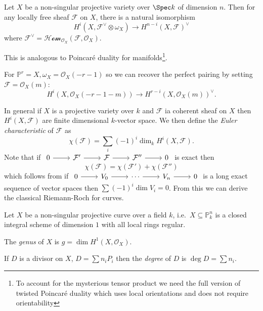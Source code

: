 \documentclass[a4paper]{article}
\renewcommand*{\P}{\mathbb{P}}
\newcommand{\sh}[1]{\mathcal{#1}} %
\begin{document}
\begin{theorem}
  Let \(X\) be a non-singular projective variety over \(\Spec k\) of dimension \(n\). Then for any locally free sheaf \(\sh F\) on \(X\), there is a natural isomorphism
  \[
    H^i(X, \sh F^\vee \otimes \omega_X) \to H^{n - i}(X, \sh F)^\vee
  \]
  where \(\sh F^\vee = \sh{Hom}_{\sh O_X}(\sh F, \sh O_X)\).
\end{theorem}

This is analogous to Poincaré duality for manifolds\footnote{To account for the mysterious tensor product we need the full version of twisted Poincaré duality which uses local orientations and does not require orientability}.

\begin{eg}
  For \(\P^r = X, \omega_X = \sh O_X(-r - 1)\) so we can recover the perfect pairing by setting \(\sh F = \sh O_X(m)\):
  \[
    H^i(X, \sh O_X(-r - 1 - m)) \to H^{r - i}(X, \sh O_X(m))^\vee.
  \]
\end{eg}

In general if \(X\) is a projective variety over \(k\) and \(\sh F\) ia coherent sheaf on \(X\) then \(H^i(X, \sh F)\) are finite dimensional \(k\)-vector space. We then define the \emph{Euler characteristic} of \(\sh F\) as
\[
  \chi(\sh F) = \sum_i (-1)^i \dim_k H^i(X, \sh F).
\]
Note that if \(
\begin{tikzcd}
  0 \ar[r] & \sh F' \ar[r] & \sh F \ar[r] & \sh F'' \ar[r] & 0
\end{tikzcd}
\) is exact then
\[
  \chi(\sh F) = \chi(\sh F') + \chi(\sh F'')
\]
which follows from if \(
\begin{tikzcd}
  0 \ar[r] & V_0 \ar[r] & \cdots \ar[r] & V_n \ar[r] & 0
\end{tikzcd}
\) is a long exact sequence of vector spaces then \(\sum (-1)^i \dim V_i = 0\). From this we can derive the classical Riemann-Roch for curves.

Let \(X\) be a non-singular projective curve over a field \(k\), i.e.\ \(X \subseteq \P^n_k\) is a closed integral scheme of dimension \(1\) with all local rings regular.

\begin{definition}[genus]
  The \emph{genus} of \(X\) is \(g = \dim H^1(X, \sh O_X)\).
\end{definition}

\begin{definition}[degree]
  If \(D\) is a divisor on \(X\), \(D = \sum n_iP_i\) then the \emph{degree} of \(D\) is \(\deg D = \sum n_i\).
\end{definition}
\end{document}
